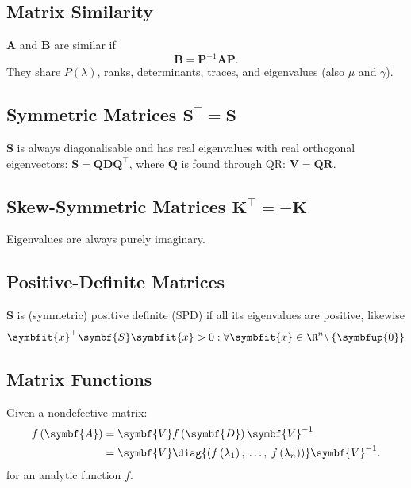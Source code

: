 \documentclass{article}
\begin{document}
\begin{multicols*}{3}
    \subsection{Matrix Similarity}
    \(\symbf{A}\) and \(\symbf{B}\) are similar if
    \begin{equation*}
        \symbf{B} = \symbf{P}^{-1} \symbf{A} \symbf{P}.
    \end{equation*}
    They share \(P(\lambda)\), ranks, determinants, traces, and eigenvalues (also \(\mu\) and \(\gamma\)).
    \subsection{Symmetric Matrices \texorpdfstring{\(\symbf{S}^\top = \symbf{S}\)}{S' = S}}
    \(\symbf{S}\) is always diagonalisable and has
    real eigenvalues with real orthogonal eigenvectors: \(\symbf{S} = \symbf{Q} \symbf{D} \symbf{Q}^\top\), where \(\symbf{Q}\) is found through QR\@: \(\symbf{V} = \symbf{Q} \symbf{R}\).
    \subsection{Skew-Symmetric Matrices \texorpdfstring{\(\symbf{K}^\top = -\symbf{K}\)}{K' = -K}}
    Eigenvalues are always purely imaginary.
    \subsection{Positive-Definite Matrices}
    \(\symbf{S}\) is (symmetric) positive definite (SPD) if all its eigenvalues are positive, likewise
    \begin{equation*}
        \symbfit{x}^\top \symbf{S} \symbfit{x} > 0 : \forall \symbfit{x} \in \R^n \backslash \left\{ \symbfup{0} \right\}
    \end{equation*}
    \subsection{Matrix Functions}
    Given a nondefective matrix:
    \begin{align*}
        f\left( \symbf{A} \right) & = \symbf{V} f\left( \symbf{D} \right) \symbf{V}^{-1}                                                               \\
                                  & = \symbf{V} \diag{\left( f\left( \lambda_1 \right),\: \ldots,\: f\left( \lambda_n \right) \right)} \symbf{V}^{-1}.
    \end{align*}
    for an analytic function \(f\).

\end{multicols*}
\end{document}
